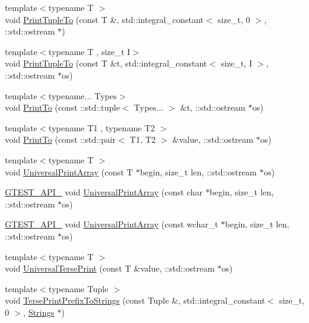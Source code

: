 \begin{DoxyCompactItemize}
\item 
{\footnotesize template$<$typename T $>$ }\\void \hyperlink{namespacetesting_1_1internal_a7174fbf5d6ba458afae675022c9aae1e}{Print\+Tuple\+To} (const T \&, std\+::integral\+\_\+constant$<$ size\+\_\+t, 0 $>$, \+::std\+::ostream $\ast$)
\item 
{\footnotesize template$<$typename T , size\+\_\+t I$>$ }\\void \hyperlink{namespacetesting_1_1internal_a3580971ab4571dc9a00f4ed0e17fd777}{Print\+Tuple\+To} (const T \&t, std\+::integral\+\_\+constant$<$ size\+\_\+t, I $>$, \+::std\+::ostream $\ast$os)
\item 
{\footnotesize template$<$typename... Types$>$ }\\void \hyperlink{namespacetesting_1_1internal_a5628347cba9a345f56087fdb70930fc8}{Print\+To} (const \+::std\+::tuple$<$ Types... $>$ \&t, \+::std\+::ostream $\ast$os)
\item 
{\footnotesize template$<$typename T1 , typename T2 $>$ }\\void \hyperlink{namespacetesting_1_1internal_af2c33928facbf2edf7af564278724d98}{Print\+To} (const \+::std\+::pair$<$ T1, T2 $>$ \&value, \+::std\+::ostream $\ast$os)
\item 
{\footnotesize template$<$typename T $>$ }\\void \hyperlink{namespacetesting_1_1internal_ad79d71c3110f8eb24ab352d68f29436a}{Universal\+Print\+Array} (const T $\ast$begin, size\+\_\+t len, \+::std\+::ostream $\ast$os)
\item 
\hyperlink{gtest-port_8h_aa73be6f0ba4a7456180a94904ce17790}{G\+T\+E\+S\+T\+\_\+\+A\+P\+I\+\_\+} void \hyperlink{namespacetesting_1_1internal_a72c997dbd2c562110b2cb56c359decfa}{Universal\+Print\+Array} (const char $\ast$begin, size\+\_\+t len, \+::std\+::ostream $\ast$os)
\item 
\hyperlink{gtest-port_8h_aa73be6f0ba4a7456180a94904ce17790}{G\+T\+E\+S\+T\+\_\+\+A\+P\+I\+\_\+} void \hyperlink{namespacetesting_1_1internal_ae31e146c35fd75afc6a9cc73ae2692d1}{Universal\+Print\+Array} (const wchar\+\_\+t $\ast$begin, size\+\_\+t len, \+::std\+::ostream $\ast$os)
\item 
{\footnotesize template$<$typename T $>$ }\\void \hyperlink{namespacetesting_1_1internal_afa92f5a284929dc3723e654a25feb7b9}{Universal\+Terse\+Print} (const T \&value, \+::std\+::ostream $\ast$os)
\item 
{\footnotesize template$<$typename Tuple $>$ }\\void \hyperlink{namespacetesting_1_1internal_a6300aa1440d0019cf08d9a1f6efd4382}{Terse\+Print\+Prefix\+To\+Strings} (const Tuple \&, std\+::integral\+\_\+constant$<$ size\+\_\+t, 0 $>$, \hyperlink{namespacetesting_1_1internal_a50003bb76ec2934be1062be11efba8bf}{Strings} $\ast$)

\end{DoxyCompactItemize}
